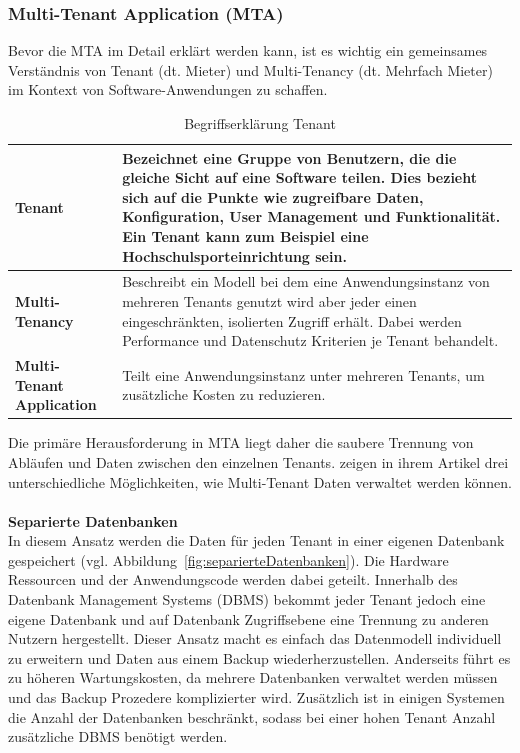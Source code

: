 \subsubsection{Multi-Tenant Application (MTA)}
Bevor die MTA im Detail erklärt werden kann, ist es wichtig ein gemeinsames Verständnis von Tenant (dt. Mieter) und Multi-Tenancy (dt. Mehrfach Mieter) im Kontext von Software-Anwendungen zu schaffen. 
\\
\begin{table}[h]
\begin{tabular}{|p{4.5cm}|p{12cm}|}
	\hline 
	\textbf{Tenant} & Bezeichnet eine Gruppe von Benutzern, die die gleiche Sicht auf eine Software teilen. Dies bezieht sich auf die Punkte wie zugreifbare Daten, Konfiguration, User Management und Funktionalität. Ein Tenant kann zum Beispiel eine Hochschulsporteinrichtung sein. \\ 
	\hline 
	\textbf{Multi-Tenancy} & Beschreibt ein Modell bei dem eine Anwendungsinstanz von mehreren Tenants genutzt wird aber jeder einen eingeschränkten, isolierten Zugriff erhält. Dabei werden Performance und Datenschutz Kriterien je Tenant behandelt. \\ 
	\hline 
	\textbf{Multi-Tenant Application} & Teilt eine Anwendungsinstanz unter mehreren Tenants, um zusätzliche Kosten zu reduzieren. \\ 
	\hline 
\end{tabular}
		\caption{Begriffserklärung Tenant \cite*[vgl. ][S.2]{Krebs.2012}}
\end{table}

Die primäre Herausforderung in MTA liegt daher die saubere Trennung von Abläufen und Daten zwischen den einzelnen Tenants. \citeauthor{Chong.2006} zeigen in ihrem Artikel drei unterschiedliche Möglichkeiten, wie Multi-Tenant Daten verwaltet werden können.
\\
\\
\textbf{Separierte Datenbanken}\\
In diesem Ansatz werden die Daten für jeden Tenant in einer eigenen Datenbank gespeichert (vgl. Abbildung~\ref{fig:separierteDatenbanken}). Die Hardware Ressourcen und der Anwendungscode werden dabei geteilt. Innerhalb des Datenbank Management Systems (DBMS) bekommt jeder Tenant jedoch eine eigene Datenbank und auf Datenbank Zugriffsebene eine Trennung zu anderen Nutzern hergestellt. Dieser Ansatz macht es einfach das Datenmodell individuell zu erweitern und Daten aus einem Backup wiederherzustellen. Anderseits führt es zu höheren Wartungskosten, da mehrere Datenbanken verwaltet werden müssen und das Backup Prozedere komplizierter wird. Zusätzlich ist in einigen Systemen die Anzahl der Datenbanken beschränkt, sodass bei einer hohen Tenant Anzahl zusätzliche DBMS benötigt werden.

